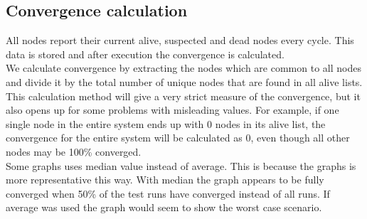 \documentclass[10pt]{proc}
\begin{document}
\subsection{Convergence calculation}
All nodes report their current alive, suspected and dead nodes every cycle. This data is stored and after execution the convergence is calculated. 
\\[10pt]
We calculate convergence by extracting the nodes which are common to all nodes and divide it by the total number of unique nodes that are found in all alive lists. This calculation method will give a very strict measure of the convergence, but it also opens up for some problems with misleading values. For example, if one single node in the entire system ends up with 0 nodes in its alive list, the convergence for the entire system will be calculated as 0, even though all other nodes may be 100\% converged. 
\\[10pt]
Some graphs uses median value instead of average. This is because the graphs is more representative this way. With median the graph appears to be fully converged when 50\% of the test runs have converged instead of all runs. If average was used the graph would seem to show the worst case scenario.
\end{document}
